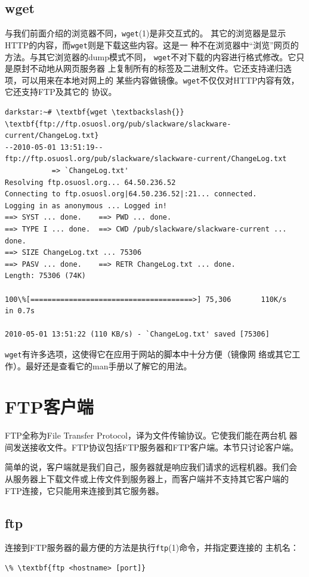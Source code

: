 \subsection{wget}
\label{chap:basicNetworkCommands:browsers:wget}
与我们前面介绍的浏览器不同，\texttt{wget}(1)是非交互式的。
其它的浏览器是显示HTTP的内容，而\texttt{wget}则是下载这些内容。这是一
种不在浏览器中``浏览''网页的方法。与其它浏览器的dump模式不同，
\texttt{wget}不对下载的内容进行格式修改。它只是原封不动地从网页服务器
上复制所有的标签及二进制文件。它还支持递归选项，可以用来在本地对网上的
某些内容做镜像。\texttt{wget}不仅仅对HTTP内容有效，它还支持FTP及其它的
协议。
\begin{Verbatim}[frame=single, commandchars=\\\{\}]
darkstar:~# \textbf{wget \textbackslash{}}
\textbf{ftp://ftp.osuosl.org/pub/slackware/slackware-current/ChangeLog.txt}
--2010-05-01 13:51:19--
ftp://ftp.osuosl.org/pub/slackware/slackware-current/ChangeLog.txt
           => `ChangeLog.txt'
Resolving ftp.osuosl.org... 64.50.236.52
Connecting to ftp.osuosl.org|64.50.236.52|:21... connected.
Logging in as anonymous ... Logged in!
==> SYST ... done.    ==> PWD ... done.
==> TYPE I ... done.  ==> CWD /pub/slackware/slackware-current ...  done.
==> SIZE ChangeLog.txt ... 75306
==> PASV ... done.    ==> RETR ChangeLog.txt ... done.
Length: 75306 (74K)

100\%[======================================>] 75,306       110K/s   in 0.7s    

2010-05-01 13:51:22 (110 KB/s) - `ChangeLog.txt' saved [75306]
\end{Verbatim}

\texttt{wget}有许多选项，这使得它在应用于网站的脚本中十分方便（镜像网
络或其它工作）。最好还是查看它的man手册以了解它的用法。

\section{FTP客户端}
\label{chap:basicNetworkCommands:ftp}
FTP全称为File Transfer Protocol，译为文件传输协议。它使我们能在两台机
器间发送接收文件。FTP协议包括FTP服务器和FTP客户端。本节只讨论客户端。

简单的说，客户端就是我们自己，服务器就是响应我们请求的远程机器。我们会
从服务器上下载文件或上传文件到服务器上，而客户端并不支持其它客户端的
FTP连接，它只能用来连接到其它服务器。

\subsection{ftp}
\label{chap:basicNetworkCommands:ftp:ftp}
连接到FTP服务器的最方便的方法是执行\texttt{ftp}(1)命令，并指定要连接的
主机名：
\begin{Verbatim}[frame=single, commandchars=\\\{\}]
\% \textbf{ftp <hostname> [port]}
\end{Verbatim}

